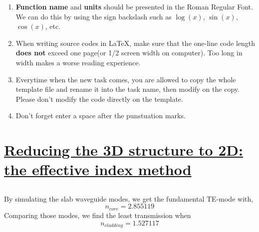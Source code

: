 \documentclass[fontsize=11pt]{scrartcl}
\begin{document}
\begin{enumerate}
    \item  \textbf{Function name} and \textbf{units} should be presented in the Roman Regular Font.
    We can do this by using the sign backslash such as $\log(x)$, $\sin(x)$, $\cos(x)$, etc.
    \item When writing source codes in \LaTeX, make sure that the one-line code length 
    \textbf{does not} exceed one page(or 1/2 screen width on computer). Too long in width makes 
    a worse reading experience.
    \item Everytime when the new task comes, you are allowed to copy the whole template file and 
    rename it into the task name, then modify on the copy. Please don't modify the code directly
    on the template.
    \item Don't forget enter a space after the punstuation marks.
\end{enumerate}



\pagebreak
\section{\uline{Reducing the 3D structure to 2D: the effective index method}}
\subsection{}
By simulating the slab waveguide modes, we get the fundamental TE-mode with,
\begin{equation} 
    n_{core}=2.855119 
    \label{eq1}
\end{equation}
Comparing those modes, we find the least transmission when
\begin{equation} 
    n_{cladding}=1.527117 
    \label{eq2}
\end{equation}
\end{document}

